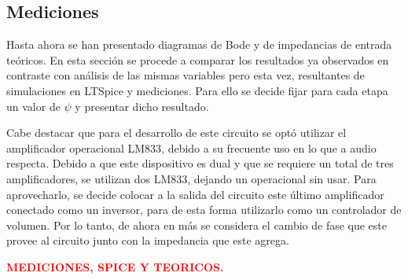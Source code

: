 \documentclass[a4paper]{article}
\begin{document}
\subsection{Mediciones}

Hasta ahora se han presentado diagramas de Bode y de impedancias de entrada teóricos. En esta sección se procede a comparar los resultados ya observados en contraste con análisis de las mismas variables pero esta vez, resultantes de simulaciones en LTSpice y mediciones. Para ello se decide fijar para cada etapa un valor de $\psi$ y presentar dicho resultado.

Cabe destacar que para el desarrollo de este circuito se optó utilizar el amplificador operacional LM833, debido a su frecuente uso en lo que a audio respecta. Debido a que este dispositivo es dual y que se requiere un total de tres amplificadores, se utilizan dos LM833, dejando un operacional sin usar. Para aprovecharlo, se decide colocar a la salida del circuito este último amplificador conectado como un inversor, para de esta forma utilizarlo como un controlador de volumen. Por lo tanto, de ahora en más se considera el cambio de fase que este provee al circuito junto con la impedancia que este agrega.   

\begin{center}
	\textcolor{red}{\textbf{MEDICIONES, SPICE Y TEORICOS.}}
\end{center} 
\end{document}
